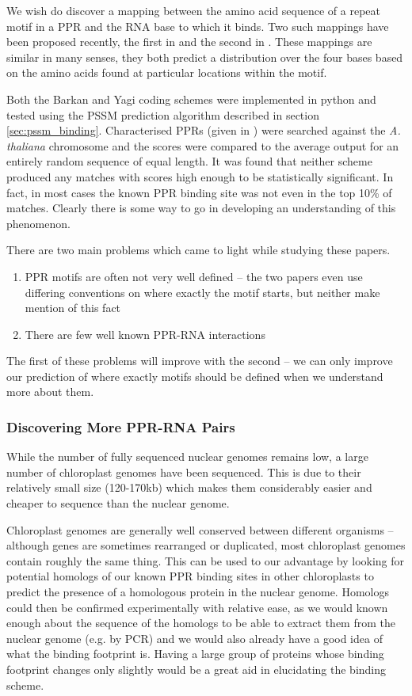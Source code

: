 We wish do discover a mapping between the amino acid sequence of a repeat
motif in a PPR and the RNA base to which it binds.
Two such mappings have been proposed recently, the first in \citet{Barkan2012}
and the second in \citet{Yagi2013}.
These mappings are similar in many senses, they both predict a distribution
over the four bases based on the amino acids found at particular locations
within the motif.

Both the Barkan and Yagi coding schemes were implemented in python and tested
using the PSSM prediction algorithm described in section
\ref{sec:pssm_binding}.
Characterised PPRs (given in \citet{Yagi2013}) were searched against the
\emph{A. thaliana} chromosome and the scores were compared to the average 
output for an entirely random sequence of equal length.
It was found that neither scheme produced any matches with scores high enough 
to be statistically significant.
In fact, in most cases the known PPR binding site was not even in the top 10\%
of matches.
Clearly there is some way to go in developing an understanding of this
phenomenon.

There are two main problems which came to light while studying these papers.
\begin{enumerate}
  \item PPR motifs are often not very well defined -- the two papers even use
    differing conventions on where exactly the motif starts, but neither make
    mention of this fact
  \item There are few well known PPR-RNA interactions
\end{enumerate}
The first of these problems will improve with the second -- we can only improve
our prediction of where exactly motifs should be defined when we understand
more about them.

\subsubsection{Discovering More PPR-RNA Pairs}

While the number of fully sequenced nuclear genomes remains low, a large 
number of chloroplast genomes have been sequenced.
This is due to their relatively small size (120-170kb) which makes them
considerably easier and cheaper to sequence than the nuclear genome.

Chloroplast genomes are generally well conserved between different organisms --
although genes are sometimes rearranged or duplicated, most chloroplast genomes
contain roughly the same thing.
This can be used to our advantage by looking for potential homologs of our known
PPR binding sites in other chloroplasts to predict the presence of a homologous
protein in the nuclear genome.
Homologs could then be confirmed experimentally with relative ease, as we would 
known enough about the sequence of the homologs to be able to extract them from 
the nuclear genome (e.g. by PCR) and we would also already have a good idea of 
what the binding footprint is.
Having a large group of proteins whose binding footprint changes only slightly
would be a great aid in elucidating the binding scheme.

